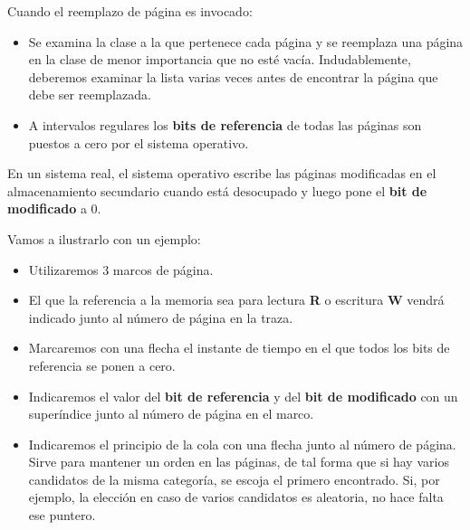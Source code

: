 Cuando el reemplazo de página es invocado:

\begin{itemize}
\item
  Se examina la clase a la que pertenece cada página y se reemplaza una
  página en la clase de menor importancia que no esté vacía.
  Indudablemente, deberemos examinar la lista varias veces antes de
  encontrar la página que debe ser reemplazada.
\item
  A intervalos regulares los \textbf{bits de referencia} de todas las
  páginas son puestos a cero por el sistema operativo.
\end{itemize}

En un sistema real, el sistema operativo escribe las páginas modificadas
en el almacenamiento secundario cuando está desocupado y luego pone el
\textbf{bit de modificado} a 0.

Vamos a ilustrarlo con un ejemplo:

\begin{itemize}
\item
  Utilizaremos 3 marcos de página.
\item
  El que la referencia a la memoria sea para lectura \textbf{R} o
  escritura \textbf{W} vendrá indicado junto al número de página en la
  traza.
\item
  Marcaremos con una flecha el instante de tiempo en el que todos los
  bits de referencia se ponen a cero.
\item
  Indicaremos el valor del \textbf{bit de referencia} y del \textbf{bit
  de modificado} con un superíndice junto al número de página en el
  marco.
\item
  Indicaremos el principio de la cola con una flecha junto al número de
  página. Sirve para mantener un orden en las páginas, de tal forma que
  si hay varios candidatos de la misma categoría, se escoja el primero
  encontrado. Si, por ejemplo, la elección en caso de varios candidatos
  es aleatoria, no hace falta ese puntero.
\end{itemize}

